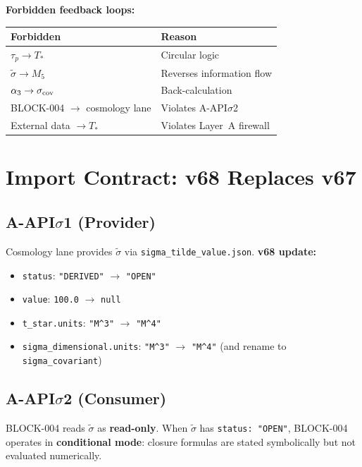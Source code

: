 \documentclass[11pt,a4paper]{article}
\theoremstyle{definition}
\theoremstyle{remark}
\begin{document}
\textbf{Forbidden feedback loops:}

\begin{center}
\begin{tabular}{ll}
\toprule
\textbf{Forbidden} & \textbf{Reason} \\
\midrule
$\tau_p \to T_*$ & Circular logic \\
$\tilde\sigma \to M_5$ & Reverses information flow \\
$\alpha_3 \to \sigma_{\rm cov}$ & Back-calculation \\
BLOCK-004 $\to$ cosmology lane & Violates A-API$\sigma$2 \\
External data $\to T_*$ & Violates Layer~A firewall \\
\bottomrule
\end{tabular}
\end{center}

\section{Import Contract: v68 Replaces v67}
\label{sec:contract}

\subsection{A-API$\sigma$1 (Provider)}

Cosmology lane provides $\tilde\sigma$ via
\texttt{sigma\_tilde\_value.json}. \textbf{v68 update:}

\begin{itemize}
\item \texttt{status}: \texttt{"DERIVED"} $\to$ \texttt{"OPEN"}
\item \texttt{value}: \texttt{100.0} $\to$ \texttt{null}
\item \texttt{t\_star.units}: \texttt{"M\^{}3"} $\to$ \texttt{"M\^{}4"}
\item \texttt{sigma\_dimensional.units}: \texttt{"M\^{}3"}
  $\to$ \texttt{"M\^{}4"} (and rename to
  \texttt{sigma\_covariant})
\end{itemize}

\subsection{A-API$\sigma$2 (Consumer)}

BLOCK-004 reads $\tilde\sigma$ as \textbf{read-only}. When
$\tilde\sigma$ has \texttt{status: "OPEN"}, BLOCK-004 operates
in \textbf{conditional mode}: closure formulas are stated
symbolically but not evaluated numerically.
\end{document}

